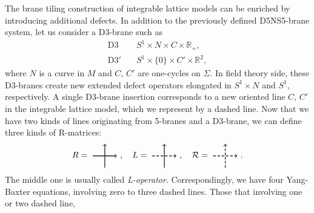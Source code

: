 The brane tiling construction of integrable lattice models can be
enriched by introducing additional defects. In addition to the previously
defined D5NS5-brane system, let us consider a D3-brane such as
\begin{align}
  \mathrm{D3}    &  \quad S^{1}  \times  N  \times  C  \times  \mathbb{R}_{+}, \label{eq:D3}\\
  \mathrm{D3'}   &  \quad S^{1}  \times \{ 0\}  \times  C'  \times  \mathbb{R}^{2}, \label{eq:D3'}
\end{align}
where $N$ is a curve in $M$ and $C,\,C'$ are one-cycles on $\Sigma$.
In field theory side, these D3-branes create new extended defect operators elongated in $S^1\times N$ and $S^1$, respectively.
A single D3-brane insertion corresponds to a new oriented line $C,\,C'$ in
the integrable lattice model, which we represent by a dashed line.
Now that we have two kinds of lines originating from 5-branes and a D3-brane,
we can define three kinds of R-matrices:
\begin{equation}
  R=
    \begin{tikzpicture}[scale=0.5, baseline=(x.base)]
        \node (x) at (0,0) {\vphantom{x}};

        \draw[thick, ->] (0,0) -- (2,0);
        \draw[thick, ->] (1,-1) -- (1,1);

    \end{tikzpicture}
  ~ ,
  \quad
  L=
    \begin{tikzpicture}[scale=0.5, baseline=(x.base)]
        \node (x) at (0,0) {\vphantom{x}};

        \draw[thick, densely dashed, ->] (0,0) -- (2,0);
        \draw[thick, ->] (1,-1) -- (1,1);

    \end{tikzpicture}
  ~ ,
  \quad
  \mathcal{R}=
    \begin{tikzpicture}[scale=0.5, baseline=(x.base)]
        \node (x) at (0,0) {\vphantom{x}};

        \draw[thick, densely dashed, ->] (0,0) -- (2,0);
        \draw[thick, densely dashed, ->] (1,-1) -- (1,1);

    \end{tikzpicture}
  ~ .
\end{equation}
The middle one is usually called \emph{L-operator}. Correspondingly,
we have four Yang-Baxter equations, involving zero to three dashed
lines. Those that involving one or two dashed line,
